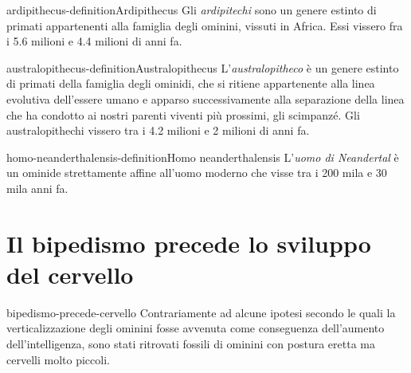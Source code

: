 \documentclass[preview]{standalone}
\begin{document}
\begin{snippetdefinition}{ardipithecus-definition}{Ardipithecus}
    Gli \textit{ardipitechi} sono un genere estinto di primati appartenenti alla famiglia degli ominini,
    vissuti in Africa.
    Essi vissero fra i 5.6 milioni e 4.4 milioni di anni fa.
\end{snippetdefinition}


\begin{snippetdefinition}{australopithecus-definition}{Australopithecus}
    L'\textit{australopitheco} è un genere estinto di primati della famiglia
    degli ominidi, che si ritiene appartenente alla linea
    evolutiva dell'essere umano e apparso successivamente alla separazione della
    linea che ha condotto ai nostri parenti viventi più prossimi, gli scimpanzé.
    Gli australopithechi vissero tra i 4.2 milioni e 2 milioni di anni fa.
\end{snippetdefinition}

\begin{snippetdefinition}{homo-neanderthalensis-definition}{Homo neanderthalensis}
    L'\textit{uomo di Neandertal} è un ominide strettamente affine all'uomo moderno
    che visse tra i 200 mila e 30 mila anni fa.
\end{snippetdefinition}


\section{Il bipedismo precede lo sviluppo del cervello}

\begin{snippet}{bipedismo-precede-cervello}
    Contrariamente ad alcune ipotesi secondo le quali la verticalizzazione degli
    ominini fosse avvenuta come conseguenza dell'aumento dell'intelligenza,
    sono stati ritrovati fossili di ominini con postura eretta ma cervelli molto piccoli.
\end{snippet}
\end{document}
